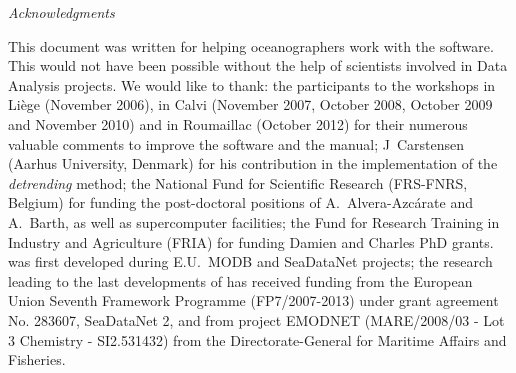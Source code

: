 
\vspace*{\fill}




{\it
\Large{Acknowledgments}
\vspace{1cm}
\parindent 1cm
\begin{center}
\begin{minipage}[c]{.85\textwidth}
\normalsize
This document was written for helping oceanographers work with the \diva software. This would not have been possible without the help of scientists involved in Data Analysis projects.
\newline
\newline
We would like to thank:
\newline
\newline
the participants to the \diva workshops in Li\`{e}ge (November 2006), in Calvi (November 2007, October 2008, October 2009 and November 2010) and in Roumaillac (October 2012) for their numerous valuable comments to improve the software and the manual;
\newline
\newline
J~Carstensen (Aarhus University, Denmark) for his contribution in the implementation of the \textit{detrending} method;
\newline
\newline 
the National Fund for Scientific Research (FRS-FNRS, Belgium) for funding the post-doctoral positions of A.~Alvera-Azc\'{a}rate and A.~Barth, as well as supercomputer facilities;
\newline
\newline
the Fund for Research Training in Industry and Agriculture (FRIA) for funding Damien and Charles PhD grants.
\newline
\newline
\diva was first developed during E.U.~MODB and SeaDataNet projects; the research leading to the last developments of \diva has received funding from the European Union Seventh Framework Programme (FP7/2007-2013) under grant agreement No. 283607, SeaDataNet 2, and from project EMODNET (MARE/2008/03 - Lot 3 Chemistry - SI2.531432) from the Directorate-General for Maritime Affairs and Fisheries. 
\vspace{2cm}
\end{minipage}

\end{center}
}

\vspace*{\fill}

\newpage
